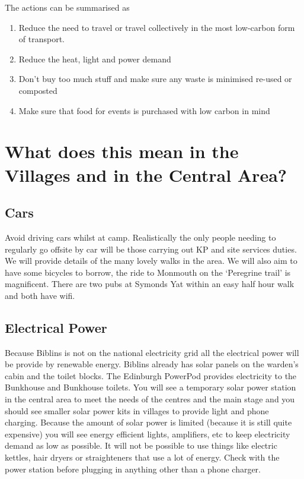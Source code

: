 \documentclass[a4paper, 11pt]{report}
\begin{document}
The actions can be summarised as
\begin{enumerate}
    \item Reduce the need to travel or travel collectively in the most low-carbon form of transport.
    \item Reduce the heat, light and power demand
    \item Don't buy too much stuff and make sure any waste is minimised re-used or composted
    \item Make sure that food for events is purchased with low carbon in mind
\end{enumerate}

\section{What does this mean in the Villages and in the Central Area?}
\subsection{Cars}
Avoid driving cars whilst at camp. Realistically the only people needing to regularly go offsite by car will be those carrying out KP and site services duties. We will provide details of the many lovely walks in the area. We will also aim to have some bicycles to borrow, the ride to Monmouth on the `Peregrine trail' is magnificent. There are two pubs at Symonds Yat within an easy half hour walk and both have wifi.
\subsection{Electrical Power}
Because Biblins is not on the national electricity grid all the electrical power will be provide by renewable energy. Biblins already has solar panels on the warden's cabin and the toilet blocks. The Edinburgh PowerPod provides electricity to the Bunkhouse and Bunkhouse toilets. You will see a temporary solar power station in the central area to meet the needs of the centres and the main stage and you should see smaller solar power kits in villages to provide light and phone charging. Because the amount of solar power is limited (because it is still quite expensive) you will see energy efficient lights, amplifiers, etc to keep electricity demand as low as possible. It will not be possible to use things like electric kettles, hair dryers or straighteners that use a lot of energy. Check with the power station before plugging in anything other than a phone charger.
\end{document}
